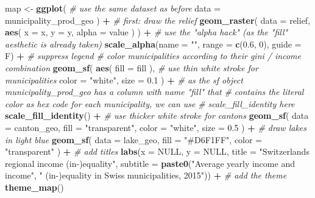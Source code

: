\documentclass[
]{article}
\newenvironment{Shaded}{\begin{snugshade}}{\end{snugshade}}
\newcommand{\AttributeTok}[1]{\textcolor[rgb]{0.13,0.29,0.53}{#1}}
\newcommand{\CommentTok}[1]{\textcolor[rgb]{0.56,0.35,0.01}{\textit{#1}}}
\newcommand{\ConstantTok}[1]{\textcolor[rgb]{0.56,0.35,0.01}{#1}}
\newcommand{\DecValTok}[1]{\textcolor[rgb]{0.00,0.00,0.81}{#1}}
\newcommand{\FloatTok}[1]{\textcolor[rgb]{0.00,0.00,0.81}{#1}}
\newcommand{\FunctionTok}[1]{\textcolor[rgb]{0.13,0.29,0.53}{\textbf{#1}}}
\newcommand{\NormalTok}[1]{#1}
\newcommand{\OtherTok}[1]{\textcolor[rgb]{0.56,0.35,0.01}{#1}}
\newcommand{\SpecialCharTok}[1]{\textcolor[rgb]{0.81,0.36,0.00}{\textbf{#1}}}
\newcommand{\StringTok}[1]{\textcolor[rgb]{0.31,0.60,0.02}{#1}}
\begin{document}
\begin{Shaded}
\begin{Highlighting}[]
\NormalTok{map }\OtherTok{\textless{}{-}} \FunctionTok{ggplot}\NormalTok{(}
  \CommentTok{\# use the same dataset as before}
  \AttributeTok{data =}\NormalTok{ municipality\_prod\_geo}
\NormalTok{  ) }\SpecialCharTok{+}
  \CommentTok{\# first: draw the relief}
  \FunctionTok{geom\_raster}\NormalTok{(}
    \AttributeTok{data =}\NormalTok{ relief,}
    \FunctionTok{aes}\NormalTok{(}
      \AttributeTok{x =}\NormalTok{ x,}
      \AttributeTok{y =}\NormalTok{ y,}
      \AttributeTok{alpha =}\NormalTok{ value}
\NormalTok{    )}
\NormalTok{  ) }\SpecialCharTok{+}
  \CommentTok{\# use the "alpha hack" (as the "fill" aesthetic is already taken)}
  \FunctionTok{scale\_alpha}\NormalTok{(}\AttributeTok{name =} \StringTok{""}\NormalTok{,}
              \AttributeTok{range =} \FunctionTok{c}\NormalTok{(}\FloatTok{0.6}\NormalTok{, }\DecValTok{0}\NormalTok{),}
              \AttributeTok{guide =}\NormalTok{ F) }\SpecialCharTok{+} \CommentTok{\# suppress legend}
  \CommentTok{\# color municipalities according to their gini / income combination}
  \FunctionTok{geom\_sf}\NormalTok{(}
    \FunctionTok{aes}\NormalTok{(}
      \AttributeTok{fill =}\NormalTok{ fill}
\NormalTok{    ),}
    \CommentTok{\# use thin white stroke for municipalities}
    \AttributeTok{color =} \StringTok{"white"}\NormalTok{,}
    \AttributeTok{size =} \FloatTok{0.1}
\NormalTok{  ) }\SpecialCharTok{+}
  \CommentTok{\# as the sf object municipality\_prod\_geo has a column with name "fill" that}
  \CommentTok{\# contains the literal color as hex code for each municipality, we can use}
  \CommentTok{\# scale\_fill\_identity here}
  \FunctionTok{scale\_fill\_identity}\NormalTok{() }\SpecialCharTok{+}
  \CommentTok{\# use thicker white stroke for cantons}
  \FunctionTok{geom\_sf}\NormalTok{(}
    \AttributeTok{data =}\NormalTok{ canton\_geo,}
    \AttributeTok{fill =} \StringTok{"transparent"}\NormalTok{,}
    \AttributeTok{color =} \StringTok{"white"}\NormalTok{,}
    \AttributeTok{size =} \FloatTok{0.5}
\NormalTok{  ) }\SpecialCharTok{+}
  \CommentTok{\# draw lakes in light blue}
  \FunctionTok{geom\_sf}\NormalTok{(}
    \AttributeTok{data =}\NormalTok{ lake\_geo,}
    \AttributeTok{fill =} \StringTok{"\#D6F1FF"}\NormalTok{,}
    \AttributeTok{color =} \StringTok{"transparent"}
\NormalTok{  ) }\SpecialCharTok{+}
  \CommentTok{\# add titles}
  \FunctionTok{labs}\NormalTok{(}\AttributeTok{x =} \ConstantTok{NULL}\NormalTok{,}
         \AttributeTok{y =} \ConstantTok{NULL}\NormalTok{,}
         \AttributeTok{title =} \StringTok{"Switzerland\textquotesingle{}s regional income (in{-})equality"}\NormalTok{,}
         \AttributeTok{subtitle =} \FunctionTok{paste0}\NormalTok{(}\StringTok{"Average yearly income and income"}\NormalTok{,}
                           \StringTok{" (in{-})equality in Swiss municipalities, 2015"}\NormalTok{)) }\SpecialCharTok{+}
  \CommentTok{\# add the theme}
  \FunctionTok{theme\_map}\NormalTok{()}
\end{Highlighting}
\end{Shaded}
\end{document}
